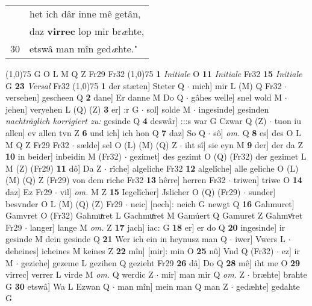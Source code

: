 \documentclass[8pt,a4paper,notitlepage]{article}
\begin{document}
\begin{table}[ht]
\begin{minipage}[t]{0.5\linewidth}
\begin{tabular}{rl}
 & het ich dâr inne mê getân,\\ 
 & daz \textbf{virrec} lop mir br\textit{æ}hte,\\ 
30 & etswâ man mîn ged\textit{æ}hte."\\ 
\end{tabular}
\scriptsize
\line(1,0){75} \newline
G O L M Q Z Fr29 Fr32 \newline
\line(1,0){75} \newline
\textbf{1} \textit{Initiale} O  \textbf{11} \textit{Initiale} Fr32  \textbf{15} \textit{Initiale} G  \textbf{23} \textit{Versal} Fr32  \newline
\line(1,0){75} \newline
\textbf{1} der stæten] Steter Q  $\cdot$ mich] mir L (M) Q Fr32  $\cdot$ versehen] gescheen Q \textbf{2} dane] Er danne M Do Q  $\cdot$ gâhes welle] snel wold M  $\cdot$ jehen] veryehen L (Q) (Z) \textbf{3} er] :r G  $\cdot$ sol] solde M  $\cdot$ ingesinde] gesinden \textit{nachträglich korrigiert zu:} gesinde Q \textbf{4} deswâr] :::s war G Czwar Q (Z)  $\cdot$ tuon iu allen] ev allen tvn Z \textbf{6} und ich] ich hon Q \textbf{7} daz] So Q  $\cdot$ sô] \textit{om.} Q \textbf{8} es] des O L M Q Z Fr29 Fr32  $\cdot$ sælde] sel O (L) (M) (Q) Z  $\cdot$ iht sî] sie eyn M \textbf{9} der] der da Z \textbf{10} in beider] inbeidin M (Fr32)  $\cdot$ gezimet] des gezimt O (Q) (Fr32) der gezimet L M (Z) (Fr29) \textbf{11} dô] Da Z  $\cdot$ rîche] algeliche Fr32 \textbf{12} algelîche] alle geliche O (L) (M) (Q) Z (Fr29) von dem riche Fr32 \textbf{13} hêrre] herren Fr32  $\cdot$ triwen] triwe O \textbf{14} daz] Ez Fr29  $\cdot$ vil] \textit{om.} M Z \textbf{15} Iegelîcher] Jslicher O (Q) (Fr29)  $\cdot$ sunder] besvnder O L (M) (Q) (Z) Fr29  $\cdot$ neic] [nech]: neich G newgt Q \textbf{16} Gahmuret] Gamvret O (Fr32) Gahmuͯret L Gachmuͯret M Gamúert Q Gamuret Z Gahmvͦret Fr29  $\cdot$ langer] lange M \textit{om.} Z \textbf{17} jach] iac: G \textbf{18} er] er do Q \textbf{20} ingesinde] ir gesinde M dein gesinde Q \textbf{21} Wer ich ein in heynusz man Q  $\cdot$ iwer] Vwers L  $\cdot$ deheines] icheines M keines Z \textbf{22} mîn] [mir]: min O \textbf{25} nû] Vnd Q (Fr32)  $\cdot$ ez] ir M  $\cdot$ geziehe] gezeme L gezihen Q gezieht Fr29 \textbf{26} dâ] Do Q \textbf{28} mê] iht me O \textbf{29} virrec] verrer L virde M \textit{om.} Q werdic Z  $\cdot$ mir] man mir Q \textit{om.} Z  $\cdot$ bræhte] brahte G \textbf{30} etswâ] Wa L Ezwan Q  $\cdot$ man mîn] mein man Q man Z  $\cdot$ gedæhte] gedahte G \newline

\end{minipage}
\end{table}
\end{document}
